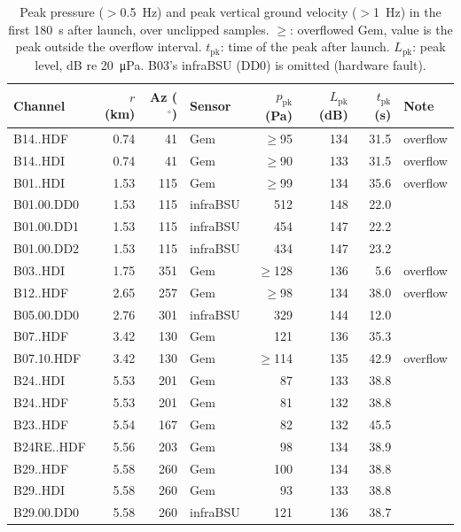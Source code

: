 \documentclass[]{seismica}
\begin{document}
\begin{table}[htbp]
  \centering
  \caption{Peak pressure ($>$0.5~Hz) and peak vertical ground velocity
    ($>$1~Hz) in the first 180~s after launch, over unclipped samples.
    $\geq$: overflowed Gem, value is the peak outside the overflow
    interval. $t_\text{pk}$: time of the peak after launch.
    $L_\text{pk}$: peak level, dB re \SI{20}{\micro\pascal}. B03's
    infraBSU (DD0) is omitted (hardware fault).}
  \label{tab:amplitudes}
  \scriptsize
  \begin{tabular}{lrrlrrrl}
    \toprule
    Channel & $r$ (km) & Az ($^{\circ}$) & Sensor & $p_\text{pk}$ (Pa) & $L_\text{pk}$ (dB) & $t_\text{pk}$ (s) & Note \\
    \midrule
    B14..HDF & 0.74 & 41 & Gem & $\geq$95 & 134 & 31.5 & overflow \\
    B14..HDI & 0.74 & 41 & Gem & $\geq$90 & 133 & 31.5 & overflow \\
    B01..HDI & 1.53 & 115 & Gem & $\geq$99 & 134 & 35.6 & overflow \\
    B01.00.DD0 & 1.53 & 115 & infraBSU & 512 & 148 & 22.0 &  \\
    B01.00.DD1 & 1.53 & 115 & infraBSU & 454 & 147 & 22.2 &  \\
    B01.00.DD2 & 1.53 & 115 & infraBSU & 434 & 147 & 23.2 &  \\
    B03..HDI & 1.75 & 351 & Gem & $\geq$128 & 136 & 5.6 & overflow \\
    B12..HDF & 2.65 & 257 & Gem & $\geq$98 & 134 & 38.0 & overflow \\
    B05.00.DD0 & 2.76 & 301 & infraBSU & 329 & 144 & 12.0 &  \\
    B07..HDF & 3.42 & 130 & Gem & 121 & 136 & 35.3 &  \\
    B07.10.HDF & 3.42 & 130 & Gem & $\geq$114 & 135 & 42.9 & overflow \\
    B24..HDI & 5.53 & 201 & Gem & 87 & 133 & 38.8 &  \\
    B24..HDF & 5.53 & 201 & Gem & 81 & 132 & 38.8 &  \\
    B23..HDF & 5.54 & 167 & Gem & 82 & 132 & 45.5 &  \\
    B24RE..HDF & 5.56 & 203 & Gem & 98 & 134 & 38.9 &  \\
    B29..HDF & 5.58 & 260 & Gem & 100 & 134 & 38.8 &  \\
    B29..HDI & 5.58 & 260 & Gem & 93 & 133 & 38.8 &  \\
    B29.00.DD0 & 5.58 & 260 & infraBSU & 121 & 136 & 38.7 &  \\

\end{tabular}
\end{table}
\end{document}
